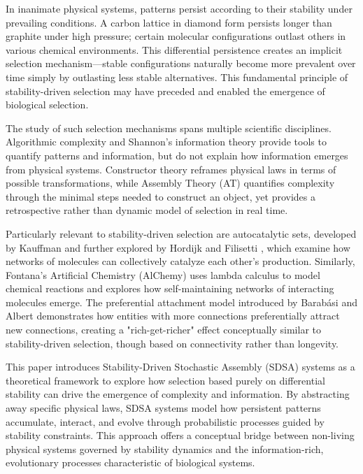 \documentclass[preprint,12pt]{elsarticle}
\begin{document}
In inanimate physical systems, patterns persist according to their stability under prevailing conditions. A carbon lattice in diamond form persists longer than graphite under high pressure; certain molecular configurations outlast others in various chemical environments. This differential persistence creates an implicit selection mechanism—stable configurations naturally become more prevalent over time simply by outlasting less stable alternatives. This fundamental principle of stability-driven selection may have preceded and enabled the emergence of biological selection.

The study of such selection mechanisms spans multiple scientific disciplines. Algorithmic complexity \cite{kolmogorov1965complexity} and Shannon's information theory \cite{shannon1948mathematical} provide tools to quantify patterns and information, but do not explain how information emerges from physical systems. Constructor theory \cite{deutsch2013constructor} reframes physical laws in terms of possible transformations, while Assembly Theory (AT) \cite{walker2023nature} quantifies complexity through the minimal steps needed to construct an object, yet provides a retrospective rather than dynamic model of selection in real time.

Particularly relevant to stability-driven selection are autocatalytic sets, developed by Kauffman \cite{kauffman1986autocatalytic} and further explored by Hordijk and Filisetti \cite{hordijk2011required}, which examine how networks of molecules can collectively catalyze each other's production. Similarly, Fontana's Artificial Chemistry (AlChemy) \cite{fontana1991algorithmic} uses lambda calculus to model chemical reactions and explores how self-maintaining networks of interacting molecules emerge. The preferential attachment model introduced by Barabási and Albert \cite{barabasi1999emergence} demonstrates how entities with more connections preferentially attract new connections, creating a "rich-get-richer" effect conceptually similar to stability-driven selection, though based on connectivity rather than longevity.

This paper introduces Stability-Driven Stochastic Assembly (SDSA) systems as a theoretical framework to explore how selection based purely on differential stability can drive the emergence of complexity and information. By abstracting away specific physical laws, SDSA systems model how persistent patterns accumulate, interact, and evolve through probabilistic processes guided by stability constraints. This approach offers a conceptual bridge between non-living physical systems governed by stability dynamics and the information-rich, evolutionary processes characteristic of biological systems.
\end{document}
